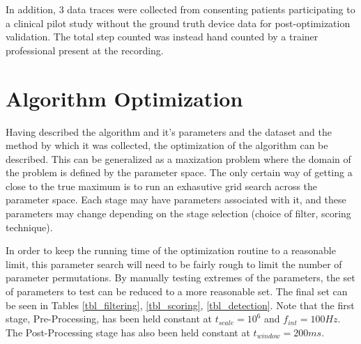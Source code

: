             In addition, 3 data traces were collected from consenting patients participating to a clinical pilot study without the ground truth device data for post-optimization validation. The total step counted was instead hand counted by a trainer professional present at the recording.

    \chapter{Algorithm Optimization}

         Having described the algorithm and it's parameters and the dataset and the method by which it was collected, the optimization of the algorithm can be described. This can be generalized as a maxization problem where the domain of the problem is defined by the parameter space. The only certain way of getting a close to the true maximum is to run an exhasutive grid search across the parameter space. Each stage may have parameters associated with it, and these parameters may change depending on the stage selection (choice of filter, scoring technique). 

        In order to keep the running time of the optimization routine to a reasonable limit, this parameter search will need to be fairly rough to limit the number of parameter permutations. By manually testing extremes of the parameters, the set of parameters to test can be reduced to a more reasonable set. The final set can be seen in Tables \ref{tbl_filtering}, \ref{tbl_scoring}, \ref{tbl_detection}. Note that the first stage, Pre-Processing, has been held constant at $t_{scale}=10^6$ and $f_{int}=100Hz$. The Post-Processing stage has also been held constant at $t_{window}=200ms$. 


